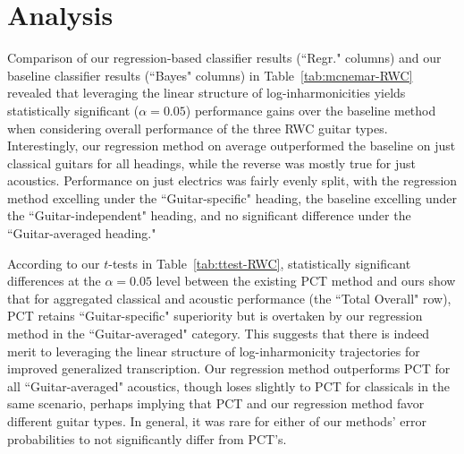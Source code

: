 \documentclass[12pt]{cmuthesis}
\begin{document}
\section{Analysis}
Comparison of our regression-based classifier results (``Regr." columns) and our baseline classifier results (``Bayes" columns) in Table~\ref{tab:mcnemar-RWC} revealed that leveraging the linear structure of log-inharmonicities yields statistically significant ($\alpha = 0.05$) performance gains over the baseline method when considering overall performance of the three RWC guitar types. Interestingly, our regression method on average outperformed the baseline on just classical guitars for all headings, while the reverse was mostly true for just acoustics. Performance on just electrics was fairly evenly split, with the regression method excelling under the ``Guitar-specific" heading, the baseline excelling under the ``Guitar-independent" heading, and no significant difference under the ``Guitar-averaged heading."

According to our $t$-tests in Table~\ref{tab:ttest-RWC}, statistically significant differences at the $\alpha = 0.05$ level between the existing PCT method and ours show that for aggregated classical and acoustic performance (the ``Total Overall" row), PCT retains ``Guitar-specific" superiority but is overtaken by our regression method in the ``Guitar-averaged" category. This suggests that there is indeed merit to leveraging the linear structure of log-inharmonicity trajectories for improved generalized transcription. Our regression method outperforms PCT for all ``Guitar-averaged" acoustics, though loses slightly to PCT for classicals in the same scenario, perhaps implying that PCT and our regression method favor different guitar types. In general, it was rare for either of our methods' error probabilities to not significantly differ from PCT's.
\end{document}
